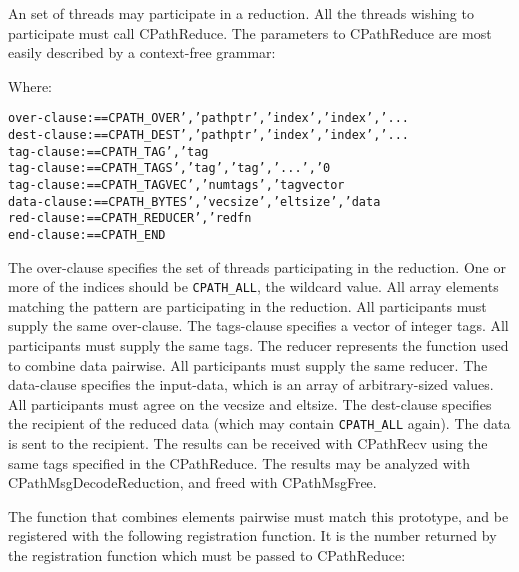 An set of threads may participate in a reduction.  All the threads
wishing to participate must call CPathReduce.  The parameters to
CPathReduce are most easily described by a context-free grammar:

Where:

\begin{alltt}
    over-clause :== CPATH_OVER ',' pathptr ',' index ',' index ',' ...
    dest-clause :== CPATH_DEST ',' pathptr ',' index ',' index ',' ...
    tag-clause  :== CPATH_TAG ',' tag
    tag-clause  :== CPATH_TAGS ',' tag ',' tag ',' ... ',' 0
    tag-clause  :== CPATH_TAGVEC ',' numtags ',' tagvector
    data-clause :== CPATH_BYTES ',' vecsize ',' eltsize ',' data
    red-clause  :== CPATH_REDUCER ',' redfn
    end-clause  :== CPATH_END
\end{alltt}

The over-clause specifies the set of threads participating in the
reduction.  One or more of the indices should be {\tt CPATH\_ALL}, the
wildcard value.  All array elements matching the pattern are
participating in the reduction.  All participants must supply the same
over-clause.  The tags-clause specifies a vector of integer tags. All
participants must supply the same tags.  The reducer represents the
function used to combine data pairwise.  All participants must supply
the same reducer.  The data-clause specifies the input-data, which is
an array of arbitrary-sized values.  All participants must agree on
the vecsize and eltsize.  The dest-clause specifies the recipient of
the reduced data (which may contain {\tt CPATH\_ALL} again).  The data
is sent to the recipient.  The results can be received with CPathRecv
using the same tags specified in the CPathReduce.  The results may be
analyzed with CPathMsgDecodeReduction, and freed with CPathMsgFree.


The function that combines elements pairwise must match this
prototype, and be registered with the following registration function.
It is the number returned by the registration function which must be
passed to CPathReduce:



